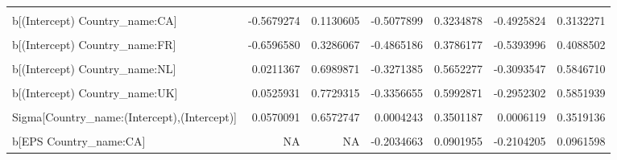 \begin{table}
\begin{tabular}[t]{lrrrrrr}
\cellcolor{gray!10}{b[(Intercept) Country\_name:BE]} & \cellcolor{gray!10}{0.1925774} & \cellcolor{gray!10}{0.8709499} & \cellcolor{gray!10}{-0.2662206} & \cellcolor{gray!10}{0.6531785} & \cellcolor{gray!10}{-0.2466859} & \cellcolor{gray!10}{0.7210911}\\
\addlinespace
b[(Intercept) Country\_name:CA] & -0.5679274 & 0.1130605 & -0.5077899 & 0.3234878 & -0.4925824 & 0.3132271\\
\cellcolor{gray!10}{b[(Intercept) Country\_name:CH]} & \cellcolor{gray!10}{-0.5889273} & \cellcolor{gray!10}{0.3142349} & \cellcolor{gray!10}{-0.4765434} & \cellcolor{gray!10}{0.3494089} & \cellcolor{gray!10}{-0.5013242} & \cellcolor{gray!10}{0.3762315}\\
b[(Intercept) Country\_name:FR] & -0.6596580 & 0.3286067 & -0.4865186 & 0.3786177 & -0.5393996 & 0.4088502\\
\cellcolor{gray!10}{b[(Intercept) Country\_name:IL]} & \cellcolor{gray!10}{-0.8757843} & \cellcolor{gray!10}{0.7671547} & \cellcolor{gray!10}{-0.5307144} & \cellcolor{gray!10}{0.4154162} & \cellcolor{gray!10}{-0.5583431} & \cellcolor{gray!10}{0.4335352}\\
b[(Intercept) Country\_name:NL] & 0.0211367 & 0.6989871 & -0.3271385 & 0.5652277 & -0.3093547 & 0.5846710\\
\addlinespace
\cellcolor{gray!10}{b[(Intercept) Country\_name:SE]} & \cellcolor{gray!10}{-0.7633199} & \cellcolor{gray!10}{-0.0088200} & \cellcolor{gray!10}{-0.5983053} & \cellcolor{gray!10}{0.3201247} & \cellcolor{gray!10}{-0.6239548} & \cellcolor{gray!10}{0.3380133}\\
b[(Intercept) Country\_name:UK] & 0.0525931 & 0.7729315 & -0.3356655 & 0.5992871 & -0.2952302 & 0.5851939\\
\cellcolor{gray!10}{b[(Intercept) Country\_name:US]} & \cellcolor{gray!10}{-0.5970784} & \cellcolor{gray!10}{0.1628913} & \cellcolor{gray!10}{-0.5232442} & \cellcolor{gray!10}{0.2863047} & \cellcolor{gray!10}{-0.4902230} & \cellcolor{gray!10}{0.2914159}\\
Sigma[Country\_name:(Intercept),(Intercept)] & 0.0570091 & 0.6572747 & 0.0004243 & 0.3501187 & 0.0006119 & 0.3519136\\
\cellcolor{gray!10}{b[EPS Country\_name:BE]} & \cellcolor{gray!10}{NA} & \cellcolor{gray!10}{NA} & \cellcolor{gray!10}{-0.0421416} & \cellcolor{gray!10}{0.3048413} & \cellcolor{gray!10}{-0.0538223} & \cellcolor{gray!10}{0.3033432}\\
\addlinespace
b[EPS Country\_name:CA] & NA & NA & -0.2034663 & 0.0901955 & -0.2104205 & 0.0961598\\

\end{tabular}
\end{table}
